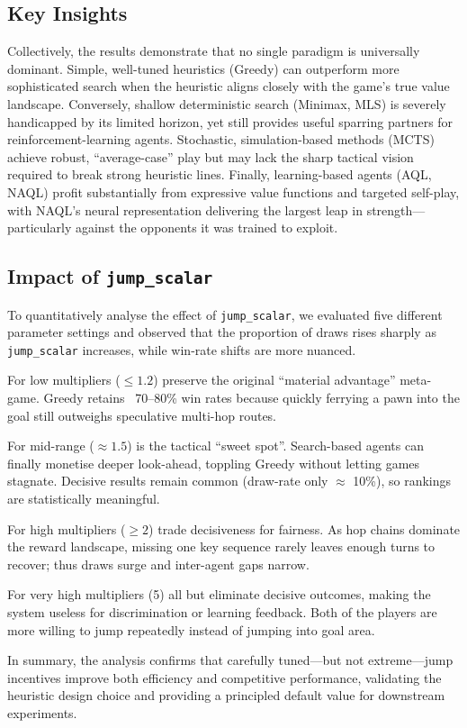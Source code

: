 \subsection{Key Insights}
Collectively, the results demonstrate that no single paradigm is universally dominant. Simple, well-tuned heuristics (Greedy) can outperform more sophisticated search when the heuristic aligns closely with the game’s true value landscape. Conversely, shallow deterministic search (Minimax, MLS) is severely handicapped by its limited horizon, yet still provides useful sparring partners for reinforcement-learning agents. Stochastic, simulation-based methods (MCTS) achieve robust, “average-case” play but may lack the sharp tactical vision required to break strong heuristic lines. Finally, learning-based agents (AQL, NAQL) profit substantially from expressive value functions and targeted self-play, with NAQL’s neural representation delivering the largest leap in strength—particularly against the opponents it was trained to exploit.

\subsection{Impact of \texttt{jump\_scalar}}
To quantitatively analyse the effect of \texttt{jump\_scalar}, we evaluated five different parameter settings and observed that the proportion of draws rises sharply as \texttt{jump\_scalar} increases, while win-rate shifts are more nuanced.

For low multipliers ($\leq 1.2$) preserve the original “material advantage” meta-game. Greedy retains ~70–80\% win rates because quickly ferrying a pawn into the goal still outweighs speculative multi-hop routes.

For mid-range ($\approx 1.5$) is the tactical “sweet spot”. Search-based agents can finally monetise deeper look-ahead, toppling Greedy without letting games stagnate. Decisive results remain common (draw-rate only $\approx$ 10\%), so rankings are statistically meaningful.

For high multipliers ($\geq 2$) trade decisiveness for fairness. As hop chains dominate the reward landscape, missing one key sequence rarely leaves enough turns to recover; thus draws surge and inter-agent gaps narrow.

For very high multipliers (5) all but eliminate decisive outcomes, making the system useless for discrimination or learning feedback. Both of the players are more willing to jump repeatedly instead of jumping into goal area.

In summary, the analysis confirms that carefully tuned—but not extreme—jump incentives improve both efficiency and competitive performance, validating the heuristic design choice and providing a principled default value for downstream experiments.